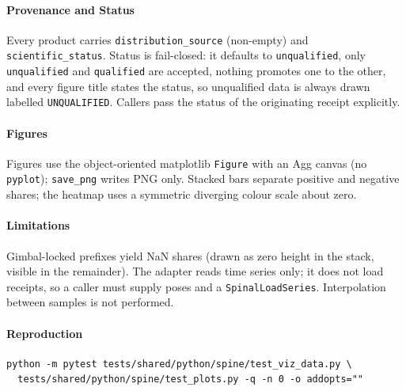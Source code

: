 \paragraph{Provenance and Status}
Every product carries \texttt{distribution\_source} (non-empty) and
\texttt{scientific\_status}. Status is fail-closed: it defaults to
\texttt{unqualified}, only \texttt{unqualified} and \texttt{qualified} are
accepted, nothing promotes one to the other, and every figure title states the
status, so unqualified data is always drawn labelled \texttt{UNQUALIFIED}.
Callers pass the status of the originating receipt explicitly.

\paragraph{Figures}
Figures use the object-oriented matplotlib \texttt{Figure} with an Agg canvas
(no \texttt{pyplot}); \texttt{save\_png} writes PNG only. Stacked bars separate
positive and negative shares; the heatmap uses a symmetric diverging colour
scale about zero.

\paragraph{Limitations}
Gimbal-locked prefixes yield NaN shares (drawn as zero height in the stack,
visible in the remainder). The adapter reads time series only; it does not load
receipts, so a caller must supply poses and a \texttt{SpinalLoadSeries}.
Interpolation between samples is not performed.

\paragraph{Reproduction}
\begin{verbatim}
python -m pytest tests/shared/python/spine/test_viz_data.py \
  tests/shared/python/spine/test_plots.py -q -n 0 -o addopts=""
\end{verbatim}
